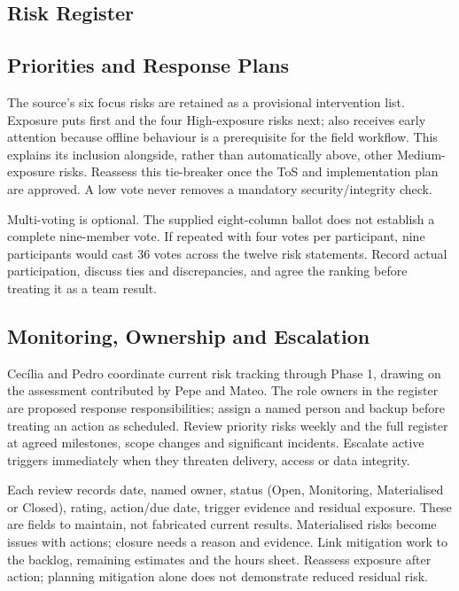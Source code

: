\subsection{Risk Register}


\subsection{Priorities and Response Plans}
The source's six focus risks are retained as a provisional intervention list.
Exposure puts  first and the four High-exposure risks next;
 also receives early attention because offline behaviour is a
prerequisite for the field workflow. This explains its inclusion alongside, rather
than automatically above, other Medium-exposure risks. Reassess this tie-breaker
once the ToS and implementation plan are approved. A low vote never removes a
mandatory security/integrity check.

Multi-voting is optional. The supplied eight-column ballot does not establish a
complete nine-member vote. If repeated with four votes per participant, nine
participants would cast 36 votes across the twelve risk statements. Record actual
participation, discuss ties and discrepancies, and agree the ranking before treating
it as a team result.




\subsection{Monitoring, Ownership and Escalation}
Cec\'{i}lia and Pedro coordinate current risk tracking through Phase 1, drawing
on the assessment contributed by Pepe and Mateo. The role owners in the
register are proposed response responsibilities; assign a named person and backup
before treating an action as scheduled. Review priority risks weekly and the full
register at agreed milestones, scope changes and significant incidents. Escalate
active triggers immediately when they threaten delivery, access or data integrity.

Each review records date, named owner, status (Open, Monitoring, Materialised or
Closed), rating, action/due date, trigger evidence and residual exposure. These are
fields to maintain, not fabricated current results. Materialised risks become issues
with actions; closure needs a reason and evidence. Link mitigation work to the
backlog, remaining estimates and the hours sheet. Reassess exposure after action;
planning mitigation alone does not demonstrate reduced residual risk.

